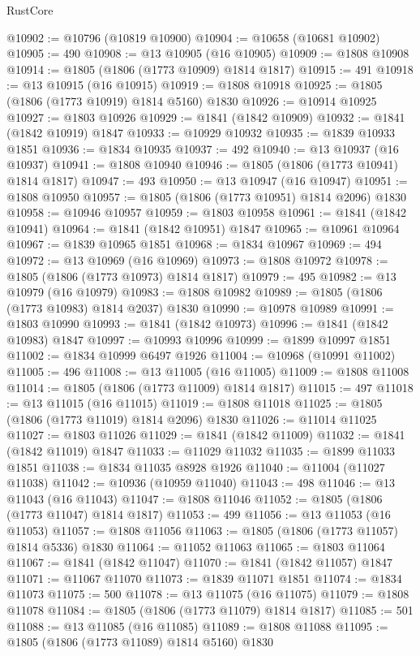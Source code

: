 \begin{lexlean}{RustCore}
\begin{coremodule}
@10902 := @10796 (@10819 @10900)
@10904 := @10658 (@10681 @10902)
@10905 := 490
@10908 := @13 @10905 (@16 @10905)
@10909 := @1808 @10908
@10914 := @1805 (@1806 (@1773 @10909) @1814 @1817)
@10915 := 491
@10918 := @13 @10915 (@16 @10915)
@10919 := @1808 @10918
@10925 := @1805 (@1806 (@1773 @10919) @1814 @5160) @1830
@10926 := @10914 @10925
@10927 := @1803 @10926
@10929 := @1841 (@1842 @10909)
@10932 := @1841 (@1842 @10919) @1847
@10933 := @10929 @10932
@10935 := @1839 @10933 @1851
@10936 := @1834 @10935
@10937 := 492
@10940 := @13 @10937 (@16 @10937)
@10941 := @1808 @10940
@10946 := @1805 (@1806 (@1773 @10941) @1814 @1817)
@10947 := 493
@10950 := @13 @10947 (@16 @10947)
@10951 := @1808 @10950
@10957 := @1805 (@1806 (@1773 @10951) @1814 @2096) @1830
@10958 := @10946 @10957
@10959 := @1803 @10958
@10961 := @1841 (@1842 @10941)
@10964 := @1841 (@1842 @10951) @1847
@10965 := @10961 @10964
@10967 := @1839 @10965 @1851
@10968 := @1834 @10967
@10969 := 494
@10972 := @13 @10969 (@16 @10969)
@10973 := @1808 @10972
@10978 := @1805 (@1806 (@1773 @10973) @1814 @1817)
@10979 := 495
@10982 := @13 @10979 (@16 @10979)
@10983 := @1808 @10982
@10989 := @1805 (@1806 (@1773 @10983) @1814 @2037) @1830
@10990 := @10978 @10989
@10991 := @1803 @10990
@10993 := @1841 (@1842 @10973)
@10996 := @1841 (@1842 @10983) @1847
@10997 := @10993 @10996
@10999 := @1899 @10997 @1851
@11002 := @1834 @10999 @6497 @1926
@11004 := @10968 (@10991 @11002)
@11005 := 496
@11008 := @13 @11005 (@16 @11005)
@11009 := @1808 @11008
@11014 := @1805 (@1806 (@1773 @11009) @1814 @1817)
@11015 := 497
@11018 := @13 @11015 (@16 @11015)
@11019 := @1808 @11018
@11025 := @1805 (@1806 (@1773 @11019) @1814 @2096) @1830
@11026 := @11014 @11025
@11027 := @1803 @11026
@11029 := @1841 (@1842 @11009)
@11032 := @1841 (@1842 @11019) @1847
@11033 := @11029 @11032
@11035 := @1899 @11033 @1851
@11038 := @1834 @11035 @8928 @1926
@11040 := @11004 (@11027 @11038)
@11042 := @10936 (@10959 @11040)
@11043 := 498
@11046 := @13 @11043 (@16 @11043)
@11047 := @1808 @11046
@11052 := @1805 (@1806 (@1773 @11047) @1814 @1817)
@11053 := 499
@11056 := @13 @11053 (@16 @11053)
@11057 := @1808 @11056
@11063 := @1805 (@1806 (@1773 @11057) @1814 @5336) @1830
@11064 := @11052 @11063
@11065 := @1803 @11064
@11067 := @1841 (@1842 @11047)
@11070 := @1841 (@1842 @11057) @1847
@11071 := @11067 @11070
@11073 := @1839 @11071 @1851
@11074 := @1834 @11073
@11075 := 500
@11078 := @13 @11075 (@16 @11075)
@11079 := @1808 @11078
@11084 := @1805 (@1806 (@1773 @11079) @1814 @1817)
@11085 := 501
@11088 := @13 @11085 (@16 @11085)
@11089 := @1808 @11088
@11095 := @1805 (@1806 (@1773 @11089) @1814 @5160) @1830

\end{coremodule}
\end{lexlean}
